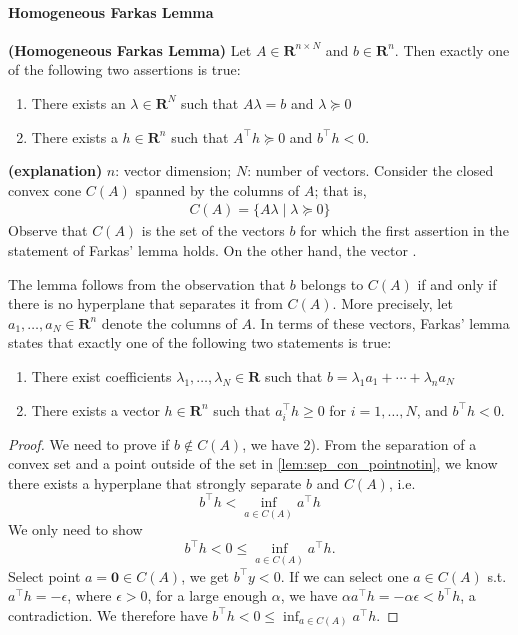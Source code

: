 \documentclass{article}
\newcommand{\bfs}[1]{\textbf{({#1}) }}
\begin{document}
\paragraph{Homogeneous Farkas Lemma}

\begin{thma}{\bfs{Homogeneous Farkas Lemma}}\label{thm:Farkas}
Let ${A} \in \mathbf{R}^{n \times N}$ and ${b} \in \mathbf{R}^{n}$. Then exactly one of the following two assertions is true:
\begin{enumerate}
    \item There exists an ${\lambda} \in \mathbf{R}^{N}$ such that ${A} {\lambda}={b}$ and ${\lambda} \succeq 0$
    \item There exists a ${h} \in \mathbf{R}^{n}$ such that ${A}^{\top} {h} \succeq  0$ and ${b}^{\top} {h}<0$.
\end{enumerate}
\end{thma} 
\begin{rema}{\bfs{explanation}}
$n$: vector dimension; $N$: number of vectors. Consider the closed convex cone $C(A)$ spanned by the columns of $A$; that is,
\begin{align*}
C(A)=\{A \lambda \mid {\lambda}\succeq 0\}
\end{align*}
Observe that $C(A)$ is the set of the vectors $b$ for which the first assertion in the statement of Farkas' lemma holds. On the other hand, the vector . 

The lemma follows from the observation that $b$ belongs  to ${ C(A )}$ if and only if there is no hyperplane that separates it from ${ C(A )}$.
More precisely, let $a_{1}, \ldots,a_{N} \in \mathbf{R}^{n}$ denote the columns of $A$. In terms of these vectors, Farkas' lemma states that exactly one of the following two statements is true:
\begin{enumerate}
    \item  There exist  coefficients $\lambda_{1}, \ldots, \lambda_{N}\in \mathbf{R}$ such that $b=\lambda_{1}a_{1}+\cdots+\lambda_{n}a_{N}$
    \item There exists a vector $h \in \mathbf{R}^{n}$ such that $a_{i}^{\top} h \geq {0}$ for $i=1, \ldots, N$, and $b^{\top} h<0$.
\end{enumerate}
\end{rema}
\begin{proof}\color{ForestGreen}
We need to prove if $b\notin C(A)$, we have 2). From the separation of a convex set and a point outside of the set in \cref{lem:sep_con_pointnotin}, we know there exists a hyperplane that strongly separate $b$ and $C(A)$, i.e. $$b^{\top} h< \inf_{a\in C(A)} a^{\top}h$$
We only need to show  $$b^{\top} h<0\le \inf_{a\in C(A)} a^{\top}h.$$
Select point $a=\mathbf{0}\in C(A)$, we get $b^{\top} y<0$. If we can select one $a\in C(A)$ s.t. $a^{\top}h=-\epsilon$, where $\epsilon>0$, for a large enough $\alpha$, we have $\alpha a^{\top}h=-\alpha\epsilon<b^{\top} h$, a contradiction. We therefore have $b^{\top} h<0\le \inf_{a\in C(A)} a^{\top}h.$
\end{proof}
\end{document}
